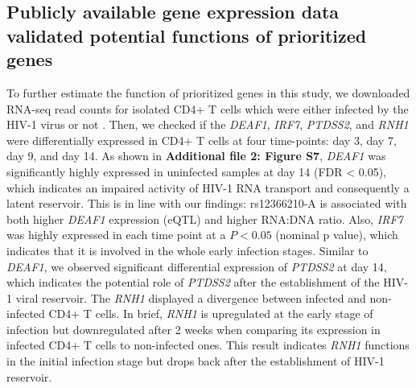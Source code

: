 \documentclass{book}
\begin{document}
\begin{refsection}
\subsection*{Publicly available gene expression data validated potential functions of prioritized genes}
To further estimate the function of prioritized genes in this study, we downloaded RNA-seq read counts for isolated CD4+ T cells which were either infected by the HIV-1 virus or not \cite{Shytaj2020Alterations}.
Then, we checked if the \textit{DEAF1}, \textit{IRF7}, \textit{PTDSS2}, and \textit{RNH1} were differentially expressed in CD4+ T cells at four time-points: day 3, day 7, day 9, and day 14.
As shown in \textbf{Additional file 2: Figure S7}, \textit{DEAF1} was significantly highly expressed in uninfected samples at day 14 (FDR < 0.05), which indicates an impaired activity of HIV-1 RNA transport and consequently a latent reservoir.
This is in line with our findings: rs12366210-A is associated with both higher \textit{DEAF1} expression (eQTL) and higher RNA:DNA ratio.
Also, \textit{IRF7} was highly expressed in each time point at a $P < 0.05$ (nominal p value), which indicates that it is involved in the whole early infection stages.
Similar to \textit{DEAF1}, we observed significant differential expression of \textit{PTDSS2} at day 14, which indicates the potential role of \textit{PTDSS2} after the establishment of the HIV-1 viral reservoir.
The \textit{RNH1} displayed a divergence between infected and non-infected CD4+ T cells.
In brief, \textit{RNH1} is upregulated at the early stage of infection but downregulated after 2 weeks when comparing its expression in infected CD4+ T cells to non-infected ones.
This result indicates \textit{RNH1} functions in the initial infection stage but drops back after the establishment of HIV-1 reservoir.


\end{refsection}
\end{document}
